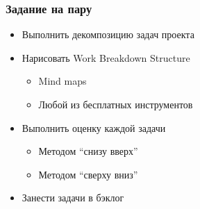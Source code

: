 \documentclass[xetex,mathserif,serif]{beamer}
\begin{document}
	\begin{frame}
		\frametitle{Задание на пару}
		\begin{itemize}
			\item Выполнить декомпозицию задач проекта
			\item Нарисовать Work Breakdown Structure
			\begin{itemize}
				\item Mind maps
				\item Любой из бесплатных инструментов
			\end{itemize}
			\item Выполнить оценку каждой задачи
			\begin{itemize}
				\item Методом ``снизу вверх''
				\item Методом ``сверху вниз''
			\end{itemize}
			\item Занести задачи в бэклог
		\end{itemize}
	\end{frame}
\end{document}
